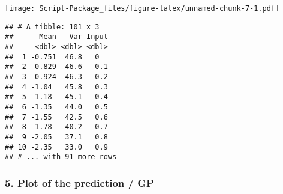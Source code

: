\documentclass[
]{article}
\begin{document}
\texttt{[image: Script-Package\_files/figure-latex/unnamed-chunk-7-1.pdf]}

\begin{verbatim}
## # A tibble: 101 x 3
##      Mean   Var Input
##     <dbl> <dbl> <dbl>
##  1 -0.751  46.8   0  
##  2 -0.829  46.6   0.1
##  3 -0.924  46.3   0.2
##  4 -1.04   45.8   0.3
##  5 -1.18   45.1   0.4
##  6 -1.35   44.0   0.5
##  7 -1.55   42.5   0.6
##  8 -1.78   40.2   0.7
##  9 -2.05   37.1   0.8
## 10 -2.35   33.0   0.9
## # ... with 91 more rows
\end{verbatim}

\hypertarget{plot-of-the-prediction-gp}{%
\subsubsection{5. Plot of the prediction /
GP}\label{plot-of-the-prediction-gp}}
\end{document}

